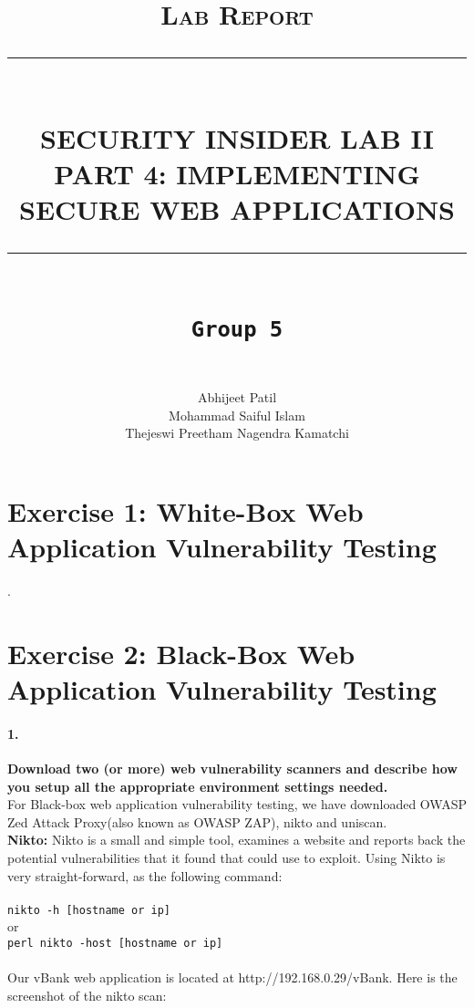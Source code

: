\documentclass[12pt]{report}
\newcommand{\HRule}[1]{\rule{\linewidth}{#1}}
\begin{document}
	
	\title{ \normalsize \textsc{Lab Report}
		\\ [2.0cm]
		\HRule{0.5pt} \\
		\LARGE \textbf{\uppercase{Security Insider Lab II \\
				Part 4: Implementing Secure Web Applications}}
		\HRule{2pt} \\ [0.5cm]
		\normalsize \vspace*{4\baselineskip}
		\LARGE {\tt Group 5}\\}
	\date{}
	\author{
		 \\
		Abhijeet Patil \\
		Mohammad Saiful Islam\\
		Thejeswi Preetham Nagendra Kamatchi}
	\maketitle
	\newpage
	
	
	\section*{Exercise 1: White-Box Web Application Vulnerability Testing}
	.
	
	\newpage
	
	\section*{Exercise 2: Black-Box Web Application Vulnerability Testing}
	
	\paragraph*{1.}{\bf Download two (or more) web vulnerability scanners and describe how you setup all the appropriate environment settings needed.}\\
	
	For Black-box web application vulnerability testing, we have downloaded OWASP Zed Attack Proxy(also known as OWASP ZAP), nikto and uniscan.\\
	
	{\bf Nikto:} Nikto is a small and simple tool, examines a website and reports back the potential vulnerabilities that it found that could use to exploit. Using Nikto is very straight-forward, as the following command:\\\\
	{\tt nikto -h [hostname or ip]}
	\\or\\
	{\tt perl nikto -host [hostname or ip]}
	\\\\Our vBank web application is located at {\sf http://192.168.0.29/vBank}. Here is the screenshot of the nikto scan:
	
\end{document}
